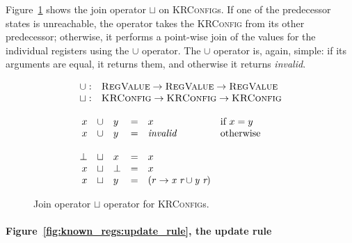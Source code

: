 Figure~\ref{fig:known_regs:join_op} shows the join operator $\sqcup$
on \textsc{KRConfig}s.  If one of the predecessor states is
unreachable, the operator takes the \textsc{KRConfig} from its
other predecessor; otherwise, it performs a point-wise join of the
values for the individual registers using the $\cup$ operator.  The
$\cup$ operator is, again, simple: if its arguments are equal, it
returns them, and otherwise it returns \textit{invalid}.

\begin{figure}
  \begin{displaymath}
    \begin{array}{l}
      \begin{array}{rl}
        \cup : & \textsc{RegValue} \rightarrow \textsc{RegValue} \rightarrow \textsc{RegValue} \\
        \sqcup : & \textsc{KRConfig} \rightarrow \textsc{KRConfig} \rightarrow \textsc{KRConfig}
      \end{array}\\\\
      \begin{array}{rclcll}
        x & \cup & y & = & x                & \textrm{if } x = y\\
        x & \cup & y & = & \mathit{invalid} & \textrm{otherwise} \\
        \\
        \bot & \sqcup & x    & = & x \\
        x    & \sqcup & \bot & = & x \\
        x    & \sqcup & y    & = & (r \rightarrow \textit{x r} \cup \textit{y r})
      \end{array}
    \end{array}
  \end{displaymath}
  \caption{Join operator $\sqcup$ operator for \textsc{KRConfig}s.}
  \label{fig:known_regs:join_op}
\end{figure}

\paragraph{Figure~\ref{fig:known_regs:update_rule}, the update rule}

